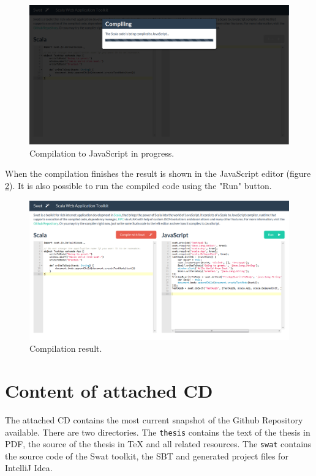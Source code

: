 \documentclass[12pt,a4paper]{report}
\begin{document}
\begin{figure}[ht]
  \centering
	\includegraphics[width=\linewidth,height=\textheight,keepaspectratio]{img/Swatting.png}
	\caption{Compilation to JavaScript in progress.}
	\label{Swatting}
\end{figure}

When the compilation finishes the result is shown in the JavaScript editor (figure \ref{Swatted}). It is also possible to run the compiled code using the "Run" button.

\begin{figure}[ht]
  \centering
	\includegraphics[width=\linewidth,height=\textheight,keepaspectratio]{img/Swatted.png}
	\caption{Compilation result.}
	\label{Swatted}
\end{figure}



\chapter{Content of attached CD}

The attached CD contains the most current snapshot of the Github Repository available. There are two directories. The \texttt{thesis} contains the text of the thesis in PDF, the source of the thesis in TeX and all related resources. The \texttt{swat} contains the source code of the Swat toolkit, the SBT and generated project files for IntelliJ Idea.
\end{document}
